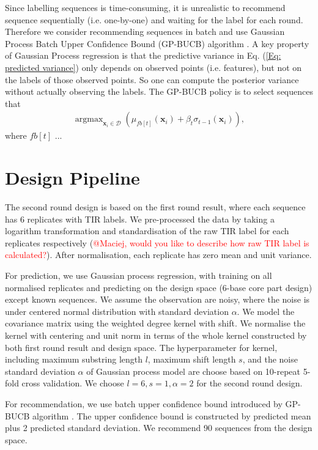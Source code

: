 Since labelling sequences is time-consuming, it is unrealistic to recommend sequence sequentially (i.e. one-by-one) and waiting for the label for each round.
Therefore we consider recommending sequences in batch and use Gaussian Process Batch Upper Confidence Bound (GP-BUCB) algorithm  \cite{desautels2012parallelizing}.
A key property of Gaussian Process regression is that the predictive variance in Eq. (\ref{Eq: predicted variance}) only depends on observed points (i.e. features), but not on the labels of those observed points. 
So one can compute the posterior variance without actually observing the labels. 
The GP-BUCB policy is to select sequences that
\begin{align}
    \operatorname{argmax}_{\mathbf{x}_i \in \mathcal{D}} \left( \mu_{fb[t]}(\mathbf{x}_i) + \beta_t \sigma_{t-1}(\mathbf{x}_i)\right),
\end{align}
where $fb[t]$ ...


\section{Design Pipeline}

The second round design is based on the first round result, where each sequence has 6 replicates with TIR labels.
We pre-processed the data by taking a logarithm transformation and standardisation of the raw TIR label for each replicates respectively (\textcolor{red}{@Maciej, would you like to describe how raw TIR label is calculated?}). 
After normalisation, each replicate has zero mean and unit variance. 

For prediction, we use Gaussian process regression, with training on all normalised replicates and predicting on the design space (6-base core part design) except known sequences. 
We assume the observation are noisy, where the noise is under centered normal distribution with standard deviation $\alpha$.  
We model the covariance matrix using the weighted degree kernel with shift. 
We normalise the kernel with centering and unit norm in terms of the whole kernel constructed by both first round result and design space. 
The hyperparameter for kernel, including maximum substring length  $l$, maximum shift length $s$, and the noise standard deviation $\alpha$ of Gaussian process model are choose based on 10-repeat 5-fold cross validation. 
We choose $l=6, s= 1, \alpha = 2$ for the second round design. 

For recommendation, we use batch upper confidence bound introduced by GP-BUCB algorithm \cite{desautels2012parallelizing}. 
The upper confidence bound is constructed by predicted mean plus 2 predicted standard deviation.   
We recommend 90 sequences from the design space. 





